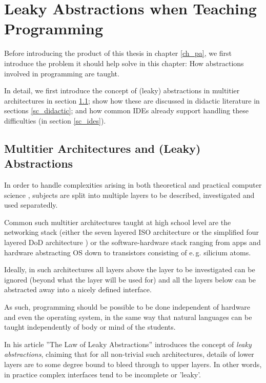 
\chapter{Leaky Abstractions when Teaching Programming} \label{cp_theory}

Before introducing the product of this thesis in chapter \ref{ch_pa}, we first introduce the problem it should help solve in this chapter: How abstractions involved in programming are taught.

In detail, we first introduce the concept of (leaky) abstractions in multitier architectures in section \ref{sc_abstractions}; show how these are discussed in didactic literature in sections \ref{sc_didactic}; and how common IDEs already support handling these difficulties (in section \ref{sc_ides}).


\section{Multitier Architectures and (Leaky) Abstractions} \label{sc_abstractions}
In order to handle complexities arising in both theoretical and practical computer science , subjects are split into multiple layers to be described, investigated and used separatedly.

Common such multitier architectures taught at high school level are the networking stack (either the seven layered ISO architecture or the simplified four layered DoD architecture ) or the software-hardware stack ranging from apps and hardware abstracting OS down to transistors consisting of e.\,g. silicium atoms.


Ideally, in such architectures all layers above the layer to be investigated can be ignored (beyond what the layer will be used for) and all the layers below can be abstracted away into a nicely defined interface.

As such, programming should be possible to be done independent of hardware and even the operating system, in the same way that natural languages can be taught independently of body or mind of the students.

In his article ''The Law of Leaky Abstractions'' \citep{Spo02} introduces the concept of \emph{leaky abstractions}, claiming that for all non-trivial such architectures, details of lower layers are to some degree bound to bleed through to upper layers. In other words, in practice complex interfaces tend to be incomplete or 'leaky'.

